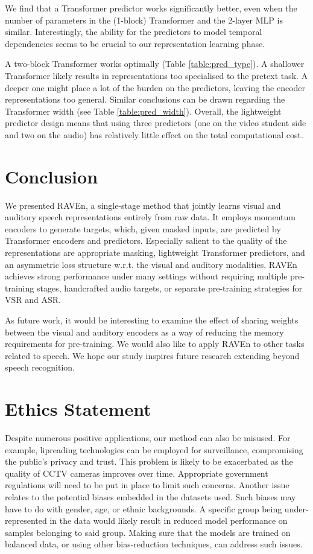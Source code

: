 \documentclass{article} \usepackage{iclr2023_conference,times}
\begin{document}
We find that a Transformer predictor works significantly better, even when the number of parameters in the (1-block) Transformer and the 2-layer MLP is similar. Interestingly, the ability for the predictors to model temporal dependencies seems to be crucial to our representation learning phase.

A two-block Transformer works optimally (Table \ref{table:pred_type}). A shallower Transformer likely results in representations too specialised to the pretext task. A deeper one might place a lot of the burden on the predictors, leaving the encoder representations too general. Similar conclusions can be drawn regarding the Transformer width (see Table \ref{table:pred_width}). Overall, the lightweight predictor design means that using three predictors (one on the video student side and two on the audio) has relatively little effect on the total computational cost.

\section{Conclusion}
We presented RAVEn, a single-stage method that jointly learns visual and auditory speech representations entirely from raw data. It employs momentum encoders to generate targets, which, given masked inputs, are predicted by Transformer encoders and predictors. Especially salient to the quality of the representations are appropriate masking, lightweight Transformer predictors, and an asymmetric loss structure w.r.t. the visual and auditory modalities. RAVEn achieves strong performance under many settings without requiring multiple pre-training stages, handcrafted audio targets, or separate pre-training strategies for VSR and ASR.

As future work, it would be interesting to examine the effect of sharing weights between the visual and auditory encoders as a way of reducing the memory requirements for pre-training. We would also like to apply RAVEn to other tasks related to speech. We hope our study inspires future research extending beyond speech recognition.

\section*{Ethics Statement}
Despite numerous positive applications, our method can also be misused. For example, lipreading technologies can be employed for surveillance, compromising the public's privacy and trust. This problem is likely to be exacerbated as the quality of CCTV cameras improves over time. Appropriate government regulations will need to be put in place to limit such concerns. Another issue relates to the potential biases embedded in the datasets used. Such biases may have to do with gender, age, or ethnic backgrounds. A specific group being under-represented in the data would likely result in reduced model performance on samples belonging to said group. Making sure that the models are trained on balanced data, or using other bias-reduction techniques, can address such issues. 
\end{document}
